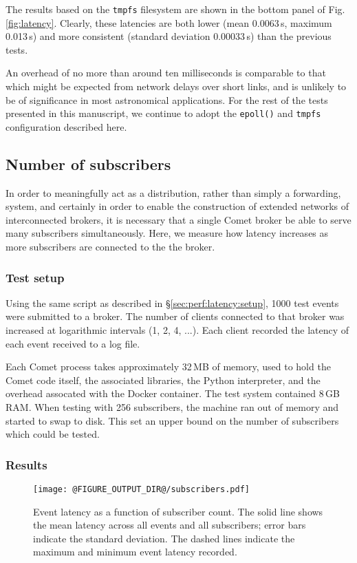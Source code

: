 \documentclass[5p,authoryear]{elsarticle}
\begin{document}
The results based on the \texttt{tmpfs} filesystem are shown in the bottom
panel of Fig. \ref{fig:latency}. Clearly, these latencies are both lower (mean
0.0063\,s, maximum 0.013\,s) and more consistent (standard deviation
0.00033\,s) than the previous tests.

An overhead of no more than around ten milliseconds is comparable to that
which might be expected from network delays over short links, and is unlikely
to be of significance in most astronomical applications. For the rest of the
tests presented in this manuscript, we continue to adopt the \texttt{epoll()}
and \texttt{tmpfs} configuration described here.

\subsection{Number of subscribers}

In order to meaningfully act as a distribution, rather than simply a
forwarding, system, and certainly in order to enable the construction of
extended networks of interconnected brokers, it is necessary that a single
Comet broker be able to serve many subscribers simultaneously. Here, we
measure how latency increases as more subscribers are connected to the the
broker.

\subsubsection{Test setup}

Using the same script as described in \S\ref{sec:perf:latency:setup}, 1000
test events were submitted to a broker. The number of clients connected to
that broker was increased at logarithmic intervals (1, 2, 4, ...). Each client
recorded the latency of each event received to a log file.

Each Comet process takes approximately 32\,MB of memory, used to hold the
Comet code itself, the associated libraries, the Python interpreter, and the
overhead assocated with the Docker container. The test system contained 8\,GB
RAM. When testing with 256 subscribers, the machine ran out of memory and
started to swap to disk. This set an upper bound on the number of subscribers
which could be tested.

\subsubsection{Results}

\begin{figure}
  \begin{center}
  \texttt{[image: @FIGURE\_OUTPUT\_DIR@/subscribers.pdf]}
  \end{center}

  \caption{Event latency as a function of subscriber count. The solid line
  shows the mean latency across all events and all subscribers; error bars
  indicate the standard deviation. The dashed lines indicate the maximum and
  minimum event latency recorded.}

  \label{fig:subscribers}
\end{figure}
\end{document}
